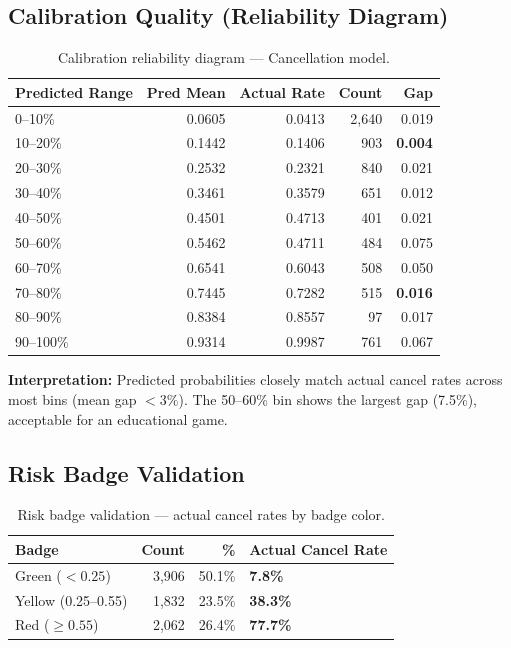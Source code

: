 \documentclass[12pt,a4paper,openany]{report}
\begin{document}
\subsection{Calibration Quality (Reliability Diagram)}

\begin{table}[H]
\centering
\caption{Calibration reliability diagram --- Cancellation model.}
\label{tab:calibration}
\small
\begin{tabular}{@{}lrrrr@{}}
\toprule
\textbf{Predicted Range} & \textbf{Pred Mean} & \textbf{Actual Rate} & \textbf{Count} & \textbf{Gap} \\
\midrule
0--10\%   & 0.0605 & 0.0413 & 2,640 & 0.019 \\
10--20\%  & 0.1442 & 0.1406 & 903   & \textbf{0.004} \\
20--30\%  & 0.2532 & 0.2321 & 840   & 0.021 \\
30--40\%  & 0.3461 & 0.3579 & 651   & 0.012 \\
40--50\%  & 0.4501 & 0.4713 & 401   & 0.021 \\
50--60\%  & 0.5462 & 0.4711 & 484   & 0.075 \\
60--70\%  & 0.6541 & 0.6043 & 508   & 0.050 \\
70--80\%  & 0.7445 & 0.7282 & 515   & \textbf{0.016} \\
80--90\%  & 0.8384 & 0.8557 & 97    & 0.017 \\
90--100\% & 0.9314 & 0.9987 & 761   & 0.067 \\
\bottomrule
\end{tabular}
\end{table}

\textbf{Interpretation:} Predicted probabilities closely match actual cancel rates across most bins (mean gap $<3\%$). The 50--60\% bin shows the largest gap (7.5\%), acceptable for an educational game.

\subsection{Risk Badge Validation}

\begin{table}[H]
\centering
\caption{Risk badge validation --- actual cancel rates by badge color.}
\label{tab:riskbadge}
\begin{tabular}{@{}lrrl@{}}
\toprule
\textbf{Badge} & \textbf{Count} & \textbf{\%} & \textbf{Actual Cancel Rate} \\
\midrule
\textcolor{green!60!black}{Green} ($<0.25$)     & 3,906 & 50.1\% & \textbf{7.8\%} \\
\textcolor{yellow!80!black}{Yellow} (0.25--0.55) & 1,832 & 23.5\% & \textbf{38.3\%} \\
\textcolor{red!70!black}{Red} ($\geq 0.55$)      & 2,062 & 26.4\% & \textbf{77.7\%} \\
\bottomrule
\end{tabular}
\end{table}
\end{document}
